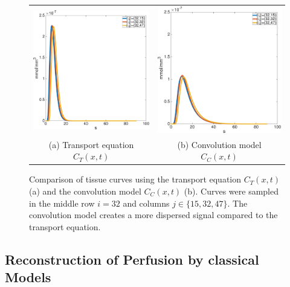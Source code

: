 \documentclass[paper=a4, fontsize=11pt,parskip=half,headings=small]{scrartcl}
\begin{document}
	\begin{figure}[H]
		\centering
		\begin{tabular}{c c}
			\includegraphics[width=.45\textwidth]{figs/PMM153247.eps} & \includegraphics[width=.45\textwidth]{figs/convM153247.eps} \\
			(a) Transport equation $C_T(x,t)$ & (b) Convolution model $C_C(x,t)$
		\end{tabular}
		\caption{Comparison of tissue curves using the transport equation $C_T(x,t)$ (a) and the convolution model $C_C(x,t)$ (b). Curves were sampled in the middle row $i=32$ and columns $j \in \{15,32,47\}$. The convolution model creates a more dispersed signal compared to the transport equation.}
		\label{fig:tissuecomp}
	\end{figure}
	
	\subsection{Reconstruction of Perfusion by classical Models}

\end{document}
